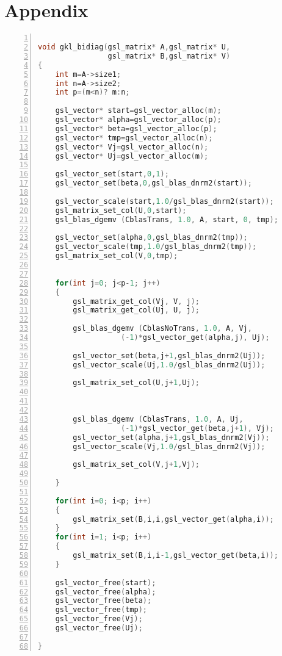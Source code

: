 \documentclass[oneside, 12pt, a4paper]{article}
\begin{document}
\section*{Appendix}

\begin{lstlisting}[language = C++, numbers=left,   
        numberstyle=\tiny,keywordstyle=\color{blue!70},  
        commentstyle=\color{red!50!green!50!blue!50},frame=shadowbox,  
        rulesepcolor=\color{red!20!green!20!blue!20},basicstyle=\ttfamily]  

void gkl_bidiag(gsl_matrix* A,gsl_matrix* U,
                gsl_matrix* B,gsl_matrix* V)
{
    int m=A->size1;
    int n=A->size2;
    int p=(m<n)? m:n;

    gsl_vector* start=gsl_vector_alloc(m);
    gsl_vector* alpha=gsl_vector_alloc(p);
    gsl_vector* beta=gsl_vector_alloc(p);
    gsl_vector* tmp=gsl_vector_alloc(n);
    gsl_vector* Vj=gsl_vector_alloc(n);
    gsl_vector* Uj=gsl_vector_alloc(m);

    gsl_vector_set(start,0,1);
    gsl_vector_set(beta,0,gsl_blas_dnrm2(start));

    gsl_vector_scale(start,1.0/gsl_blas_dnrm2(start));
    gsl_matrix_set_col(U,0,start);
    gsl_blas_dgemv (CblasTrans, 1.0, A, start, 0, tmp);

    gsl_vector_set(alpha,0,gsl_blas_dnrm2(tmp));
    gsl_vector_scale(tmp,1.0/gsl_blas_dnrm2(tmp));
    gsl_matrix_set_col(V,0,tmp);


    for(int j=0; j<p-1; j++)
    {
        gsl_matrix_get_col(Vj, V, j);
        gsl_matrix_get_col(Uj, U, j);

        gsl_blas_dgemv (CblasNoTrans, 1.0, A, Vj, 
                   (-1)*gsl_vector_get(alpha,j), Uj);

        gsl_vector_set(beta,j+1,gsl_blas_dnrm2(Uj));
        gsl_vector_scale(Uj,1.0/gsl_blas_dnrm2(Uj));

        gsl_matrix_set_col(U,j+1,Uj);



        gsl_blas_dgemv (CblasTrans, 1.0, A, Uj, 
                   (-1)*gsl_vector_get(beta,j+1), Vj);
        gsl_vector_set(alpha,j+1,gsl_blas_dnrm2(Vj));
        gsl_vector_scale(Vj,1.0/gsl_blas_dnrm2(Vj));

        gsl_matrix_set_col(V,j+1,Vj);

    }

    for(int i=0; i<p; i++)
    {
        gsl_matrix_set(B,i,i,gsl_vector_get(alpha,i));
    }
    for(int i=1; i<p; i++)
    {
        gsl_matrix_set(B,i,i-1,gsl_vector_get(beta,i));
    }

    gsl_vector_free(start);
    gsl_vector_free(alpha);
    gsl_vector_free(beta);
    gsl_vector_free(tmp);
    gsl_vector_free(Vj);
    gsl_vector_free(Uj);

}  
 \end{lstlisting}  
\end{document}
